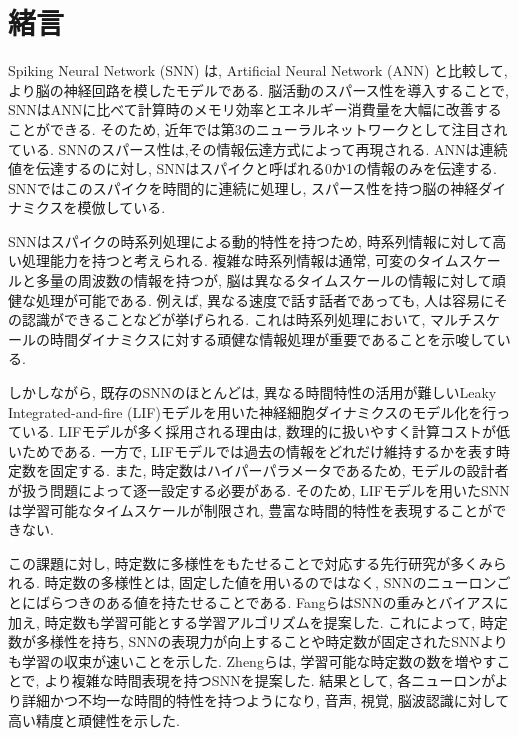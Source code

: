 \section{緒言}
Spiking Neural Network (SNN) は, Artificial Neural Network (ANN) と比較して, より脳の神経回路を模したモデルである\cite{TAVANAEI201947}.
脳活動のスパース性を導入することで, SNNはANNに比べて計算時のメモリ効率とエネルギー消費量を大幅に改善することができる.
そのため, 近年では第3のニューラルネットワークとして注目されている\cite{Henkes2024}.
SNNのスパース性は,その情報伝達方式によって再現される.
ANNは連続値を伝達するのに対し, SNNはスパイクと呼ばれる0か1の情報のみを伝達する.
SNNではこのスパイクを時間的に連続に処理し, スパース性を持つ脳の神経ダイナミクスを模倣している.

SNNはスパイクの時系列処理による動的特性を持つため, 時系列情報に対して高い処理能力を持つと考えられる\cite{zheng2024temporal}.
複雑な時系列情報は通常, 可変のタイムスケールと多量の周波数の情報を持つが, 脳は異なるタイムスケールの情報に対して頑健な処理が可能である\cite{10.1162/jocn_a_01615}.
例えば, 異なる速度で話す話者であっても, 人は容易にその認識ができることなどが挙げられる.
これは時系列処理において, マルチスケールの時間ダイナミクスに対する頑健な情報処理が重要であることを示唆している.

しかしながら, 既存のSNNのほとんどは, 異なる時間特性の活用が難しいLeaky Integrated-and-fire (LIF)モデルを用いた神経細胞ダイナミクスのモデル化を行っている\cite{dayan2003theoretical}.
LIFモデルが多く採用される理由は, 数理的に扱いやすく計算コストが低いためである.
一方で, LIFモデルでは過去の情報をどれだけ維持するかを表す時定数を固定する.
また, 時定数はハイパーパラメータであるため, モデルの設計者が扱う問題によって逐一設定する必要がある.
そのため, LIFモデルを用いたSNNは学習可能なタイムスケールが制限され, 豊富な時間的特性を表現することができない.

この課題に対し, 時定数に多様性をもたせることで対応する先行研究が多くみられる\cite{10.1145/3407197.3407225}\cite{ParametricSNN}.
時定数の多様性とは, 固定した値を用いるのではなく, SNNのニューロンごとにばらつきのある値を持たせることである.
Fangら\cite{ParametricSNN}はSNNの重みとバイアスに加え, 時定数も学習可能とする学習アルゴリズムを提案した.
これによって, 時定数が多様性を持ち, SNNの表現力が向上することや時定数が固定されたSNNよりも学習の収束が速いことを示した.
Zhengら\cite{zheng2024temporal}は, 学習可能な時定数の数を増やすことで, より複雑な時間表現を持つSNNを提案した.
結果として, 各ニューロンがより詳細かつ不均一な時間的特性を持つようになり, 音声, 視覚, 脳波認識に対して高い精度と頑健性を示した.

